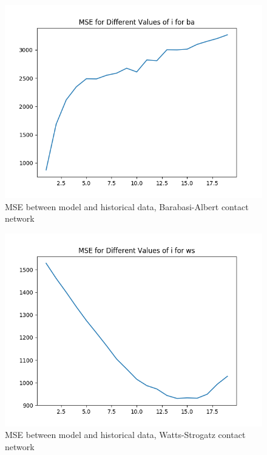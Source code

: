 \documentclass[conference]{IEEEtran}
\begin{document}
\begin{figure}[t]
    \centering
    \includegraphics[scale=0.5]{images/mse_ba.png}
    \caption{MSE between model and historical data, Barabasi-Albert contact network}
    \label{fig:mse_ba}
\end{figure}

\begin{figure}[t]
    \centering
    \includegraphics[scale=0.5]{images/mse_ws.png}
    \caption{MSE between model and historical data, Watts-Strogatz contact network}
    \label{fig:mse_ws}
\end{figure}
\end{document}
